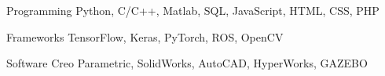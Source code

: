 


\begin{cvskills}


\cvskill
{Programming} %
{Python, C/C++, Matlab, SQL, JavaScript, HTML, CSS, PHP} %


\cvskill
{Frameworks} %
{TensorFlow, Keras, PyTorch, ROS, OpenCV} %


\cvskill
{Software} %
{Creo Parametric, SolidWorks, AutoCAD, HyperWorks, GAZEBO} %


\end{cvskills}